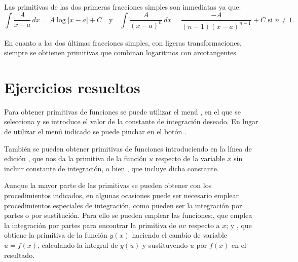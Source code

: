 Las primitivas de las dos primeras fracciones simples son inmediatas
ya que:
\[
\int \frac{A}{x-a}\,dx=A\log|x-a|+C
\quad \textrm{y} \quad
\int \frac{A}{(x-a)^n}\,dx=\frac{-A}{(n-1)(x-a)^{n-1}}+C \textrm{ si $n\neq 1$}.
\]

En cuanto a las dos últimas fracciones simples, con ligeras
transformaciones, siempre se obtienen primitivas que combinan
logaritmos con arcotangentes.

\newpage

\section{Ejercicios resueltos}

\begin{indicacion}
{Para obtener primitivas de funciones se puede utilizar el menú
, en el que se selecciona
 y se introduce el valor de la constante de
integración deseado. En lugar de utilizar el menú indicado se puede
pinchar en el botón .

También se pueden obtener primitivas de funciones introduciendo en
la línea de edición , que nos da la primitiva de
la función $u$ respecto de la variable $x$ sin incluir constante de
integración, o bien , que incluye dicha
constante.

Aunque la mayor parte de las primitivas se pueden obtener con los
procedimientos indicados, en algunas ocasiones puede ser necesario
emplear procedimientos especiales de integración, como pueden ser la
integración por partes o por sustitución. Para ello se pueden
emplear las funciones:, que emplea la
integración por partes para encontrar la primitiva de $uv$ respecto
a $x$; y , que obtiene la primitiva de la
función $y(x)$ haciendo el cambio de variable $u=f(x)$, calculando
la integral de $y(u)$ y sustituyendo $u$ por $f(x)$ en el resultado.

}
\end{indicacion}

